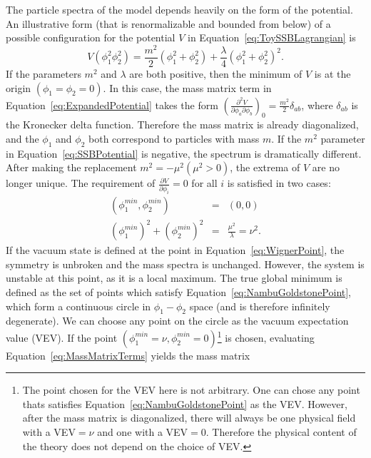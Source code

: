 The particle spectra of the model depends heavily on the form of the potential.
An illustrative form (that is renormalizable and bounded from below) of a
possible configuration for the potential $V$ in
Equation~\ref{eq:ToySSBLagrangian} is 
\begin{equation}
  V(\phi_1^2 \phi_2^2) = \frac{m^2}{2}(\phi_1^2 + \phi_2^2) +
  \frac{\lambda}{4}(\phi_1^2+\phi_2^2)^2.
  \label{eq:SSBPotential}
\end{equation}
If the parameters $m^2$ and $\lambda$ are both positive, then the minimum of $V$
is at the origin $(\phi_1 = \phi_2 = 0)$.  In this case, the mass matrix term in
Equation~\ref{eq:ExpandedPotential} takes the form $\left(\frac {\partial^2
V}{\partial \phi_a \partial \phi_b}\right)_{0} = \frac{m^2}{2}\delta_{ab}$,
where $\delta_{ab}$ is the Kronecker delta function.  Therefore the mass matrix
is already diagonalized, and the $\phi_1$ and $\phi_2$ both correspond to
particles with mass $m$.  If the $m^2$ parameter in
Equation~\ref{eq:SSBPotential} is negative, the spectrum is dramatically
different.  After making the replacement $m^2 = -\mu^2 (\mu^2 > 0)$, the extrema
of $V$ are no longer unique.  The requirement of $\frac{\partial V}{\partial
\phi_i} = 0$ for all $i$ is satisfied in two cases:
\begin{eqnarray}
  (\phi^{min}_1, \phi^{min}_2) & = & (0,0) \label{eq:WignerPoint}\\
  (\phi^{min}_1)^2+ (\phi^{min}_2)^2 & = & \frac{\mu^2}{\lambda} = \nu^2. 
  \label{eq:NambuGoldstonePoint} 
\end{eqnarray}
If the vacuum state is defined at the point in Equation~\ref{eq:WignerPoint},
the symmetry is unbroken and the mass spectra is unchanged.  However, the system
is unstable at this point, as it is a local maximum.  The true global minimum is
defined as the set of points which satisfy
Equation~\ref{eq:NambuGoldstonePoint}, which form a continuous circle in
$\phi_1-\phi_2$ space (and is therefore infinitely degenerate).  We can choose
any point on the circle as the vacuum expectation value (VEV).  If the point
$(\phi_1^{min} = \nu, \phi_2^{min} = 0)$\footnote{The point chosen for the VEV
here is not arbitrary.  One can chose any point thats satisfies
Equation~\ref{eq:NambuGoldstonePoint} as the VEV\@.  However, after the mass
matrix is diagonalized, there will always be one physical field with a VEV$ =
\nu$ and one with a VEV$ = 0$.  Therefore the physical content of the theory
does not depend on the choice of VEV\@.} is chosen, evaluating
Equation~\ref{eq:MassMatrixTerms} yields the mass matrix 
